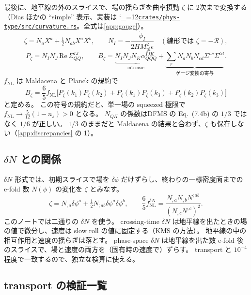 \documentclass[a4paper,11pt]{ltjsarticle}
\newcommand{\Mpl}{M_{\mathrm{pl}}}
\newcommand{\fnl}{f_{\mathrm{NL}}}
\newcommand{\repourl}{https://github.com/inuverse44/phys-type-dev}
\newcommand{\reporev}{b1fea87}
\newcommand{\repo}{\begingroup\catcode`\_=12\relax\repoaux}
\newcommand{\repoaux}[1]{\href{\repourl/blob/\reporev/#1}{\nolinkurl{#1}}\endgroup}
\begin{document}
最後に、地平線の外のスライスで、場の揺らぎを曲率摂動 $\zeta$ に 2次まで変換する（Dias ほか\cite{DEFMS2015}の ``simple'' 表示、実装は \repo{crates/phys-type/src/curvature.rs}。全式は\ref{app:gauge}）。
\[
\zeta=N_aX^a+\tfrac12N_{ab}X^aX^b,\qquad N_I=-\frac{\dot\phi_I}{2H\Mpl^2\epsilon}\quad(\text{線形では }\zeta=-\mathcal R),
\]
\begin{equation}
P_\zeta=N_IN_J\,\mathrm{Re}\,\Sigma^{IJ}_{QQ},\qquad
B_\zeta=\underbrace{N_IN_JN_K\alpha^{IJK}_{QQQ}}_{\text{intrinsic}}
+\underbrace{\sum_rN_aN_bN_{cd}\Sigma^{ac}\Sigma^{bd}}_{\text{ゲージ変換の寄与}} .
\end{equation}
$\fnl$ は Maldacena\cite{Maldacena2003} と Planck\cite{Planck2018X} の規約で
\begin{equation}
B_\zeta=\frac65\fnl\big[P_\zeta(k_1)P_\zeta(k_2)+P_\zeta(k_1)P_\zeta(k_3)+P_\zeta(k_2)P_\zeta(k_3)\big]
\end{equation}
と定める。
この符号の規約だと、単一場の squeezed 極限で $\fnl\to\tfrac5{12}(1-n_s)>0$ となる。
$N_{Q\Pi}$ の係数はDFMS の Eq.~(7.4b)\cite{DFMS2016} の $1/3$ ではなく $1/6$ が正しい。
$1/3$ のままだと Maldacena の結果と合わず、$\zeta$ も保存しない（\ref{app:discrepancies} の 1）。

\subsection{\texorpdfstring{$\delta N$}{δN} との関係}

$\delta N$ 形式では、初期スライスで場を $\delta\phi$ だけずらし、終わりの一様密度面までの e-fold 数 $N(\phi)$ の変化を $\zeta$ とみなす。
\[
\zeta=N_{,a}\delta\phi^a+\tfrac12N_{;ab}\delta\phi^a\delta\phi^b,\qquad
\frac65\fnl^{\delta N}=\frac{N_{,a}N_{,b}N^{;ab}}{(N_{,c}N^{,c})^2}.
\]
このノートでは二通りの $\delta N$ を使う。
crossing-time $\delta N$ は地平線を出たときの場の値で微分し、速度は slow roll の値に固定する（KMS の方法）。
地平線の中の相互作用と速度の揺らぎは落とす。
phase-space $\delta N$ は地平線を出た数 e-fold 後のスライスで、場と速度の両方を（固有時の速度で）ずらす。
transport と $10^{-4}$ 程度で一致するので、独立な検算に使える。

\subsection{transport の検証一覧}
\end{document}
